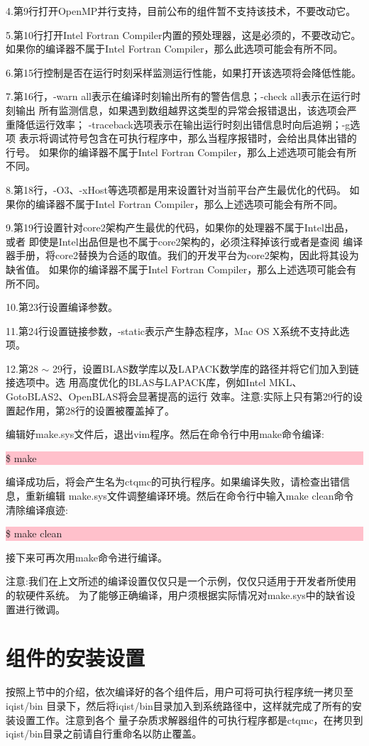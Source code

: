 4.第9行打开OpenMP并行支持，目前公布的{\iqist}组件暂不支持该技术，不要改动它。

5.第10行打开Intel Fortran Compiler内置的预处理器，这是必须的，不要改动它。
如果你的编译器不属于Intel Fortran Compiler，那么此选项可能会有所不同。

6.第15行控制是否在运行时刻采样监测运行性能，如果打开该选项将会降低性能。

7.第16行，-warn all表示在编译时刻输出所有的警告信息；-check all表示在运行时刻输出
所有监测信息，如果遇到数组越界这类型的异常会报错退出，该选项会严重降低运行效率；
-traceback选项表示在输出运行时刻出错信息时向后追朔；-g选项
表示将调试符号包含在可执行程序中，那么当程序报错时，会给出具体出错的行号。
如果你的编译器不属于Intel Fortran Compiler，那么上述选项可能会有所不同。

8.第18行，-O3、-xHost等选项都是用来设置针对当前平台产生最优化的代码。
如果你的编译器不属于Intel Fortran Compiler，那么上述选项可能会有所不同。

9.第19行设置针对core2架构产生最优的代码，如果你的处理器不属于Intel出品，或者
即使是Intel出品但是也不属于core2架构的，必须注释掉该行或者是查阅
编译器手册，将core2替换为合适的取值。我们的开发平台为core2架构，因此将其设为缺省值。
如果你的编译器不属于Intel Fortran Compiler，那么上述选项可能会有所不同。

10.第23行设置编译参数。

11.第24行设置链接参数，-static表示产生静态程序，Mac OS X系统不支持此选项。

12.第28 $\sim$ 29行，设置BLAS数学库以及LAPACK数学库的路径并将它们加入到链接选项中。选
用高度优化的BLAS与LAPACK库，例如Intel MKL、GotoBLAS2、OpenBLAS将会显著提高{\iqist}的运行
效率。注意:实际上只有第29行的设置起作用，第28行的设置被覆盖掉了。

编辑好make.sys文件后，退出vim程序。然后在命令行中用make命令编译:

\noindent\colorbox{pink}{\parbox[r]{\linewidth}{\quad \$ make}}

编译成功后，将会产生名为ctqmc的可执行程序。如果编译失败，请检查出错信息，重新编辑
make.sys文件调整编译环境。然后在命令行中输入make clean命令清除编译痕迹:

\noindent\colorbox{pink}{\parbox[r]{\linewidth}{\quad \$ make clean}}

接下来可再次用make命令进行编译。

注意:我们在上文所述的编译设置仅仅只是一个示例，仅仅只适用于开发者所使用的软硬件系统。
为了能够正确编译{\iqist}，用户须根据实际情况对make.sys中的缺省设置进行微调。

\section{{\iqist}组件的安装设置}
\label{sec:setup}

按照上节中的介绍，依次编译好{\iqist}的各个组件后，用户可将可执行程序统一拷贝至iqist/bin
目录下，然后将iqist/bin目录加入到系统路径中，这样就完成了所有的安装设置工作。注意到各个
量子杂质求解器组件的可执行程序都是ctqmc，在拷贝到iqist/bin目录之前请自行重命名以防止覆盖。
